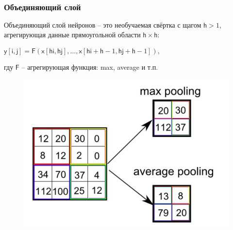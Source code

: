 \documentclass[unicode,9pt, pdf]{beamer}
\begin{document}
\begin{frame}
    \frametitle{Объединяющий слой}

    Объединяющий слой нейронов -- это необучаемая свёртка с щагом $\mathsf{h} >1$, агрегирующая данные прямоугольной области $\mathsf{h} \times \mathsf{h}$:

    \begin{center}
    	$\mathsf{y}[\mathsf{i},\mathsf{j}] = \mathsf{F}(\mathsf{x}[\mathsf{hi},\mathsf{hj}],\dots,\mathsf{x}[\mathsf{hi} + \mathsf{h} - 1, \mathsf{hj} + \mathsf{h} - 1])$,
    \end{center}
гду $\mathsf{F}$ -- агрегирующая функция: max, average и т.п.

\begin{figure}[h]
	\begin{center}
		\begin{minipage}[h]{0.72\linewidth}
			\includegraphics[width=1\linewidth]{cnn2.JPG}
		\end{minipage}
	\end{center}
\end{figure}

\end{frame}
\end{document}
